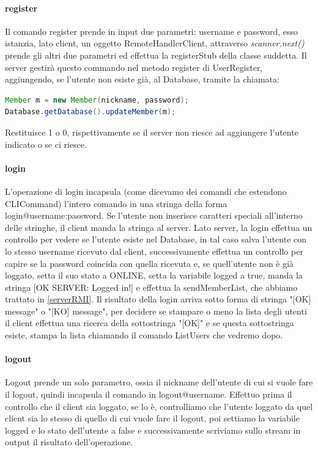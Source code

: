 \documentclass[]{article}
\begin{document}
\paragraph{register}
Il comando register prende in input due parametri: username e password, esso istanzia, lato client, un oggetto RemoteHandlerClient, attraverso \textit{scanner.next()} prende gli altri due parametri ed effettua la registerStub della classe suddetta. Il server gestirà questo commando nel metodo register di UserRegister, aggiungendo, se l'utente non esiste già, al Database, tramite la chiamata:
\begin{lstlisting}[language=java]
Member m = new Member(nickname, password);
Database.getDatabase().updateMember(m);
\end{lstlisting}
Restituisce 1 o 0, rispettivamente se il server non riesce ad aggiungere l'utente indicato o se ci riesce.
\paragraph{login}
L'operazione di login incapsula (come dicevamo dei comandi che estendono CLICommand) l'intero comando in una stringa della forma\\ login@username:password. Se l'utente non inserisce caratteri speciali all'interno delle stringhe, il client manda la stringa al server.
Lato server, la login effettua un controllo per vedere se l'utente esiste nel Database, in tal caso salva l'utente con lo stesso username ricevuto dal client, successivamente effettua un controllo per capire se la password coincida con quella ricevuta e, se quell'utente non è già loggato, setta il suo stato a ONLINE, setta la variabile logged a true, manda la stringa [OK SERVER: Logged in!] e effettua la sendMemberList, che abbiamo trattato in \autoref{serverRMI}.
Il risultato della login arriva sotto forma di stringa "[OK] message" o "[KO] message", per decidere se stampare o meno la lista degli utenti il client effettua una ricerca della sottostringa "[OK]" e se questa sottostringa esiste, stampa la lista chiamando il comando ListUsers che vedremo dopo.
\paragraph{logout}
Logout prende un solo parametro, ossia il nickname dell'utente di cui si vuole fare il logout, quindi incapsula il comando in logout@username. Effettuo prima il controllo che il client sia loggato, se lo è, controlliamo che l'utente loggato da quel client sia lo stesso di quello di cui vuole fare il logout, poi settiamo la variabile logged e lo stato dell'utente a false e successivamente scriviamo sullo stream in output il risultato dell'operazione.
\end{document}
